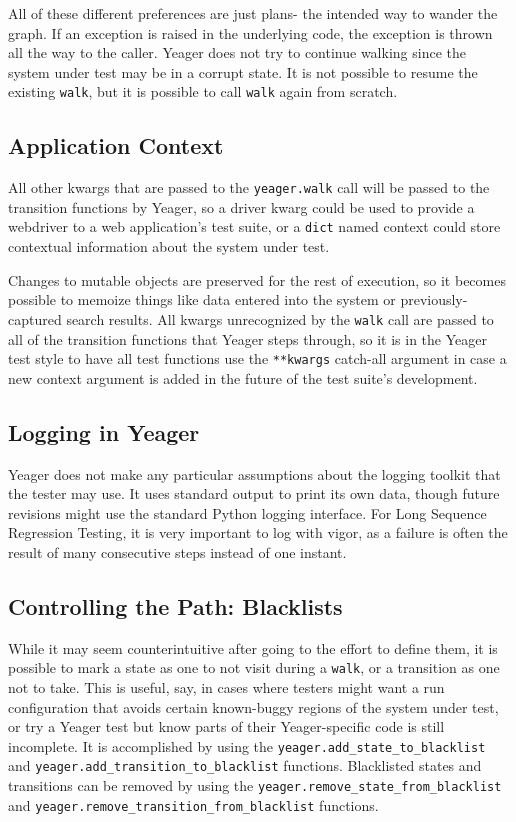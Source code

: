All of these different preferences are just plans- the intended way to wander the graph. If an exception is raised in the underlying code, the exception is thrown all the way to the caller. Yeager does not try to continue walking since the system under test may be in a corrupt state. It is not possible to resume the existing \texttt{walk}, but it is possible to call \texttt{walk} again from scratch.

\subsection{Application Context}
All other kwargs that are passed to the \texttt{yeager.walk} call will be passed to the transition functions by Yeager, so a driver kwarg could be used to provide a webdriver to a web application's test suite, or a \texttt{dict} named context could store contextual information about the system under test.

Changes to mutable objects are preserved for the rest of execution, so it becomes possible to memoize things like data entered into the system or previously-captured search results. All kwargs unrecognized by the \texttt{walk} call are passed to all of the transition functions that Yeager steps through, so it is in the Yeager test style to have all test functions use the \texttt{**kwargs} catch-all argument in case a new context argument is added in the future of the test suite's development.

\subsection{Logging in Yeager}
Yeager does not make any particular assumptions about the logging toolkit that the tester may use. It uses standard output to print its own data, though future revisions might use the standard Python logging interface. For Long Sequence Regression Testing, it is very important to log with vigor, as a failure is often the result of many consecutive steps instead of one instant.

\subsection{Controlling the Path: Blacklists}
While it may seem counterintuitive after going to the effort to define them, it is possible to mark a state as one to not visit during a \texttt{walk}, or a transition as one not to take. This is useful, say, in cases where testers might want a run configuration that avoids certain known-buggy regions of the system under test, or try a Yeager test but know parts of their Yeager-specific code is still incomplete. It is accomplished by using the \texttt{yeager.add\_state\_to\_blacklist} and \texttt{yeager.add\_transition\_to\_blacklist} functions. Blacklisted states and transitions can be removed by using the \texttt{yeager.remove\_state\_from\_blacklist} and \texttt{yeager.remove\_transition\_from\_blacklist} functions.

